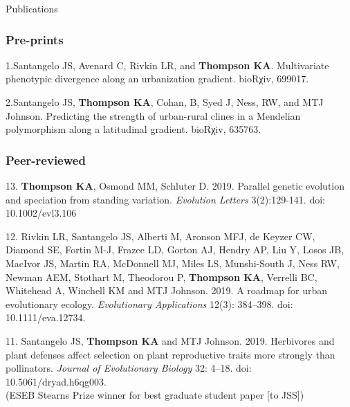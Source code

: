 \documentclass[11pt]{article}
\begin{document}
\noindent\begin{rSection}{Publications}

\subsubsection*{Pre-prints}

\noindent\hspace{.1cm}1.\tab Santangelo JS, Avenard C, Rivkin LR, and \textbf{Thompson KA}. Multivariate phenotypic divergence along an urbanization gradient. bioRχiv, 699017.

\noindent\hspace{.1cm}2.\tab Santangelo JS, \textbf{Thompson KA}, Cohan, B, Syed J, Ness, RW, and MTJ Johnson. Predicting the strength of urban-rural clines in a Mendelian polymorphism along a latitudinal gradient. bioRχiv, 635763.

\subsubsection*{Peer-reviewed}


\noindent\hspace{.1cm}13. \textbf{Thompson KA}, Osmond MM, Schluter D. 2019. Parallel genetic evolution and speciation from standing variation. \textit{Evolution Letters} 3(2):129-141. doi: 10.1002/evl3.106

\noindent\hspace{.1cm}12.  Rivkin LR, Santangelo JS, Alberti M, Aronson MFJ, de Keyzer CW, Diamond SE, Fortin M-J, Frazee LD, Gorton AJ, Hendry AP, Liu Y, Losos JB, MacIvor JS, Martin RA, McDonnell MJ, Miles LS, Munshi-South J, Ness RW, Newman AEM, Stothart M, Theodorou P, \textbf{Thompson KA}, Verrelli BC, Whitehead A, Winchell KM and MTJ Johnson. 2019. A roadmap for urban evolutionary ecology. \textit{Evolutionary Applications} 12(3): 384–398. doi: 10.1111/eva.12734.

\noindent\hspace{.1cm}11. Santangelo JS, \textbf{Thompson KA} and MTJ Johnson. 2019. Herbivores and plant defenses affect selection on plant reproductive traits more strongly than pollinators. \textit{Journal of Evolutionary Biology} 32: 4–18. doi: 10.5061/dryad.h6qg003. \\
(ESEB Stearns Prize winner for best graduate student paper [to JSS])


\end{rSection}
\end{document}
